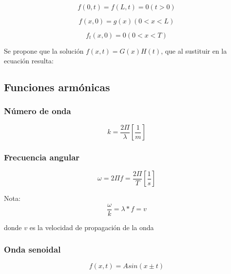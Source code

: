 \documentclass[]{article}
\begin{document}
\begin{equation}
f(0,t)=f(L,t)=0 (t>0)
\end{equation}


\begin{equation}
f(x,0)=g(x)  (0<x<L)
\end{equation}


\begin{equation}
f_t(x,0)=0   (0<x<T)
\end{equation}

Se propone que la solución $f(x,t)=G(x)H(t)$, que al sustituir en la ecuación resulta:

\subsection{Funciones armónicas}

\subsubsection{Número de onda}

\begin{equation}
k=\frac{2 \Pi}{\lambda}[\frac{1}{m}]
\end{equation}


\subsubsection{Frecuencia angular}

\begin{equation}
\omega = 2 \Pi f=\frac{2 \Pi}{T}[\frac{1}{s}]
\end{equation}

Nota:\\

\begin{equation}
\frac{\omega}{k}=\lambda * f=v
\end{equation}

donde $v$ es la velocidad de propagación de la onda\\

\subsubsection{Onda senoidal}

\begin{equation}
f(x,t)=Asin(x \pm t)
\label{senA}
\end{equation}
\end{document}
